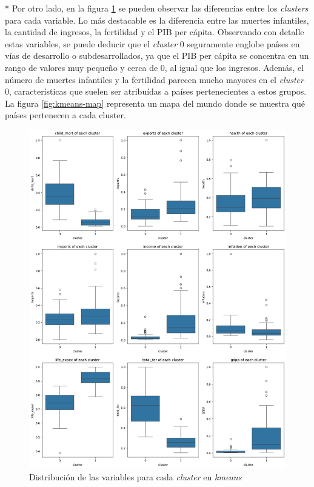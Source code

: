 \documentclass{article}
\begin{document}
\begin{paracol}{2}
  \sloppy
  \switchcolumn[0]*
  \noindent Por otro lado, en la figura \ref{fig:kmeans-features} se pueden observar las diferencias entre los \textit{clusters} para cada variable.
  Lo más destacable es la diferencia entre las muertes infantiles, la cantidad de ingresos, la fertilidad y el PIB per cápita.
  Observando con detalle estas variables, se puede deducir que el \textit{cluster} 0 seguramente englobe países en vías de desarrollo o subdesarrollados, ya que el PIB per cápita se concentra en un rango de valores muy pequeño y cerca de 0, al igual que los ingresos.
  Además, el número de muertes infantiles y la fertilidad parecen mucho mayores en el \textit{cluster} 0, características que suelen ser atribuídas a países pertenecientes a estos grupos.\\

  \noindent La figura \ref{fig:kmeans-map} representa un mapa del mundo donde se muestra qué países pertenecen a cada cluster.

  \switchcolumn
  \begin{figure}[H]
    \includegraphics[width=\linewidth]{../images/kmeans/features-dist.png}
    \caption{Distribución de las variables para cada \textit{cluster} en \textit{kmeans}}
    \label{fig:kmeans-features}
  \end{figure}
\end{paracol}
\end{document}
